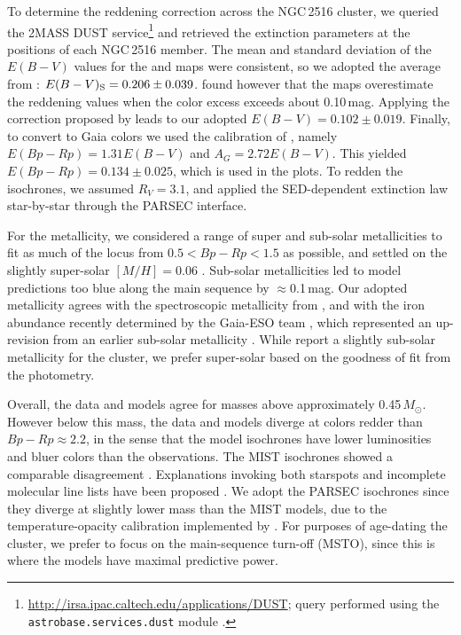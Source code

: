 \documentclass[12pt,twocolumn,tighten]{aastex63}
\begin{document}
To determine the reddening correction across the NGC\,2516 cluster, we
queried the 2MASS
DUST
service\footnote{
	\url{http://irsa.ipac.caltech.edu/applications/DUST};
	query performed using the \texttt{astrobase.services.dust} module
	\citep{bhatti_astrobase_2018}.
}
and retrieved the extinction parameters at the positions of each
NGC\,2516 member.  The mean and standard
deviation of the $E(B-V)$ values for the \citet{schlegel_maps_1998}
and \citet{schlafly_measuring_2011} maps were consistent, so we
adopted the average from \citet{schlegel_maps_1998}: $E(B-V)_{\rm
S}=0.206\pm0.039$.  \citet{bonifacio_search_2000} found however that
the \citet{schlegel_maps_1998} maps overestimate the reddening values
when the color excess exceeds about 0.10\,mag. Applying the correction
proposed by \citet{bonifacio_search_2000} leads to our adopted
$E(B-V)=0.102\pm0.019$.  Finally, to convert to Gaia colors we used
the calibration of \citet{stassun_TIC8_2019}, namely $E(Bp-Rp)=1.31
E(B-V)$ and $A_G=2.72 E(B-V)$.  This yielded $E(Bp-Rp)=0.134\pm0.025$,
which is used in the plots.  To redden the isochrones, we assumed
$R_V=3.1$, and applied the \citet{odonnell_1994} SED-dependent
extinction law star-by-star through the PARSEC interface. 

For the metallicity, we considered a range of super and sub-solar
metallicities to fit as much of the locus from $0.5<Bp-Rp<1.5$ as
possible, and settled on the slightly super-solar $[M/H]=0.06$
\citep{cummings_2011_li_iron}.  Sub-solar metallicities led to model
predictions too blue along the main sequence by $\approx$0.1\,mag.
Our adopted metallicity agrees with the spectroscopic metallicity from
\citet[][Sec~4.4.4]{cummings_2011_li_iron}, and with the iron
abundance recently determined by the Gaia-ESO team
\citep{baratella_gaiaeso_2020}, which represented an up-revision from
an earlier sub-solar metallicity \citep{randich_gaiaeso_2018}.  While
\citet{bailey_rv_2018} report a slightly sub-solar metallicity for the
cluster, we prefer super-solar based on the goodness of fit from the
photometry.

Overall, the data and models agree for masses above approximately
0.45\,$M_\odot$.  However below this mass, the data and models diverge
at colors redder than $Bp-Rp\approx2.2$, in the sense that the model
isochrones have lower luminosities and bluer colors than the
observations.  The MIST isochrones showed a comparable disagreement
\citep{choi_mesa_2016}.  Explanations invoking both starspots and
incomplete molecular line lists have been proposed \citep[{\it
e.g.},][]{stauffer_why_2003,feiden_magnetic_2013,rajpurohit_effective_2013,mann_spectrothermometry_2013,choi_mesa_2016}.
We adopt the PARSEC isochrones since they diverge at slightly lower
mass than the MIST models, due to the temperature-opacity calibration
implemented by \citet{chen_improving_2014}.  For purposes of
age-dating the cluster, we prefer to focus on the main-sequence
turn-off (MSTO), since this is where the models have maximal predictive
power.
\end{document}
